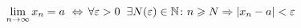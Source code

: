\documentclass[preview]{standalone}
\begin{document}
\begin{align*}
\lim_{n \to \infty}x_n=a \ \Leftrightarrow \, \forall \varepsilon >0\hspace{2mm} \exists N(\varepsilon )\in \mathbb {N} \colon n\geqslant N \Rightarrow |x_{n} - a|<\varepsilon
\end{align*}
\end{document}
